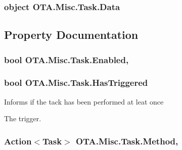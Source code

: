 \subsubsection[{Data}]{\setlength{\rightskip}{0pt plus 5cm}object O\+T\+A.\+Misc.\+Task.\+Data}\label{class_o_t_a_1_1_misc_1_1_task_abd6edc6db04205c6d4f944e23a4bb97e}


\subsection{Property Documentation}
\hypertarget{class_o_t_a_1_1_misc_1_1_task_a43780240f87ab467d37df5ba129dbe21}{}
\subsubsection[{Enabled}]{\setlength{\rightskip}{0pt plus 5cm}bool O\+T\+A.\+Misc.\+Task.\+Enabled\hspace{0.3cm}{\ttfamily [get]}, {\ttfamily [set]}}\label{class_o_t_a_1_1_misc_1_1_task_a43780240f87ab467d37df5ba129dbe21}
\hypertarget{class_o_t_a_1_1_misc_1_1_task_aba95bd17285d68319df89d3af69c5469}{}
\subsubsection[{Has\+Triggered}]{\setlength{\rightskip}{0pt plus 5cm}bool O\+T\+A.\+Misc.\+Task.\+Has\+Triggered\hspace{0.3cm}{\ttfamily [get]}}\label{class_o_t_a_1_1_misc_1_1_task_aba95bd17285d68319df89d3af69c5469}


Informs if the tack has been performed at leat once 

The trigger. \hypertarget{class_o_t_a_1_1_misc_1_1_task_a6f959163d25cfc7dc5674615268bb15b}{}
\subsubsection[{Method}]{\setlength{\rightskip}{0pt plus 5cm}Action$<${\bf Task}$>$ O\+T\+A.\+Misc.\+Task.\+Method\hspace{0.3cm}{\ttfamily [get]}, {\ttfamily [set]}}\label{class_o_t_a_1_1_misc_1_1_task_a6f959163d25cfc7dc5674615268bb15b}


